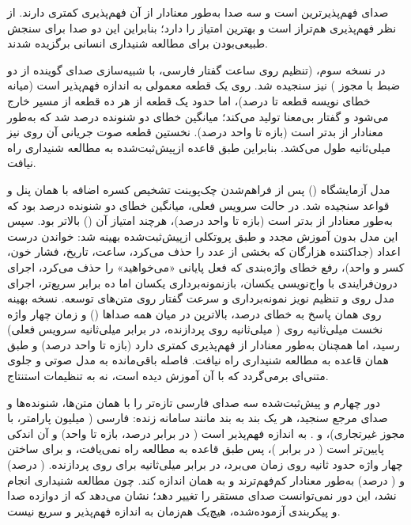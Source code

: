 صدای  فهم‌پذیرترین است و سه صدا به‌طور معنادار از آن
فهم‌پذیری کمتری دارند.  از نظر فهم‌پذیری هم‌تراز است و
بهترین امتیاز  را دارد؛ بنابراین این دو صدا برای سنجش
طبیعی‌بودن برای مطالعه شنیداری انسانی برگزیده شدند.

در نسخه سوم،  (تنظیم  روی  ساعت
گفتار فارسی، با شبیه‌سازی صدای گوینده  از دو ضبط با مجوز ) نیز
سنجیده شد. روی یک قطعه معمولی به اندازه  فهم‌پذیر است (میانه خطای نویسه
قطعه  تا  درصد)، اما حدود یک قطعه از هر ده قطعه از مسیر خارج می‌شود
و گفتار بی‌معنا تولید می‌کند؛ میانگین خطای دو شنونده  درصد شد که به‌طور
معنادار از  بدتر است (بازه  تا  واحد درصد). نخستین
قطعه صوت جریانی آن روی  نیز  میلی‌ثانیه طول می‌کشد. بنابراین طبق
قاعده ازپیش‌ثبت‌شده به مطالعه شنیداری راه نیافت.

مدل  آزمایشگاه () پس از فراهم‌شدن
چک‌پوینت تشخیص کسره اضافه با همان پنل و قواعد سنجیده شد. در حالت سرویس فعلی،
میانگین خطای دو شنونده  درصد بود که به‌طور معنادار از  بدتر
است (بازه  تا  واحد درصد)، هرچند امتیاز  آن
() بالاتر بود. سپس این مدل بدون آموزش مجدد و طبق پروتکلی ازپیش‌ثبت‌شده
بهینه شد: خواندن درست اعداد (جداکننده هزارگان که بخشی از عدد را حذف می‌کرد،
ساعت، تاریخ، فشار خون، کسر و واحد)، رفع خطای واژه‌بندی که فعل پایانی
«می‌خواهید» را حذف می‌کرد، اجرای درون‌فرایندی  با واج‌نویسی یکسان،
بازنمونه‌برداری یکسان اما ده برابر سریع‌تر، اجرای مدل روی  و تنظیم نویز
نمونه‌برداری و سرعت گفتار روی متن‌های توسعه. نسخه بهینه روی همان  پاسخ به
خطای  درصد، بالاترین  در میان همه صداها () و زمان
چهار واژه نخست  میلی‌ثانیه روی  ( میلی‌ثانیه روی
پردازنده، در برابر  میلی‌ثانیه سرویس فعلی) رسید، اما همچنان به‌طور معنادار
از  فهم‌پذیری کمتری دارد (بازه  تا  واحد درصد) و
طبق همان قاعده به مطالعه شنیداری راه نیافت. فاصله باقی‌مانده به مدل صوتی و
جلوی متنی‌ای برمی‌گردد که با آن آموزش دیده است، نه به تنظیمات استنتاج.

دور چهارم و پیش‌ثبت‌شده سه صدای فارسی تازه‌تر را با همان متن‌ها، شنونده‌ها و صدای
مرجع  سنجید، هر یک بند به بند مانند سامانه زنده:  فارسی
( میلیون پارامتر، با مجوز غیرتجاری)،  و
.  به اندازه  فهم‌پذیر است
( در برابر  درصد، بازه  تا  واحد) و  آن
اندکی پایین‌تر است ( در برابر )، پس طبق قاعده به مطالعه راه
نمی‌یافت، و برای ساختن چهار واژه حدود  ثانیه روی  زمان می‌برد، در
برابر  میلی‌ثانیه برای  روی پردازنده.  (
درصد) و  ( درصد) به‌طور معنادار کم‌فهم‌ترند و به همان اندازه کند.
چون مطالعه شنیداری انجام نشد، این دور نمی‌توانست صدای مستقر را تغییر دهد؛ نشان
می‌دهد که از دوازده صدا و پیکربندی آزموده‌شده، هیچ‌یک هم‌زمان به اندازه 
فهم‌پذیر و سریع نیست.

